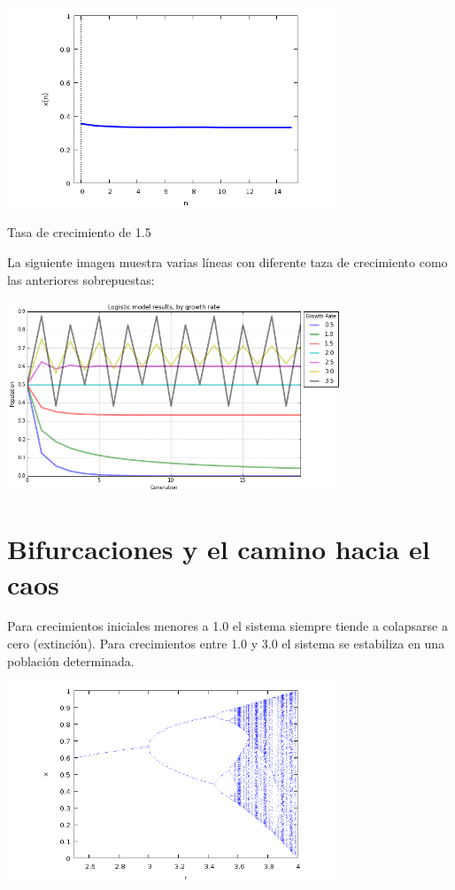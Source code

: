\documentclass{article} %
\begin{document}
\begin{center}

	\includegraphics[width=10cm]{3.png}

Tasa de crecimiento de 1.5

\end{center}

La siguiente imagen muestra varias líneas con diferente taza de crecimiento como las anteriores sobrepuestas:

\begin{center}

	\includegraphics[width=10cm]{logistic-model-line.png}
    
\end{center}


\section*{Bifurcaciones y el camino hacia el caos}

Para crecimientos iniciales menores a 1.0 el sistema siempre tiende a colapsarse a cero (extinción). Para crecimientos entre 1.0 y 3.0 el sistema se estabiliza en una población determinada. 

\begin{center}

	\includegraphics[width=10cm]{4.png}
    
\end{center}
\end{document}
